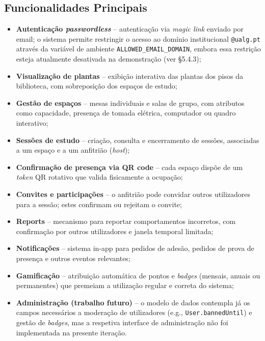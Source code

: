 \documentclass[11pt,a4paper]{article}
\begin{document}
\subsection{Funcionalidades Principais}
\begin{itemize}[leftmargin=*]
    \item \textbf{Autenticação \emph{passwordless}} -- autenticação via
          \emph{magic link} enviado por email; o sistema permite restringir o
          acesso ao domínio institucional \texttt{@ualg.pt} através da variável
          de ambiente \texttt{ALLOWED\_EMAIL\_DOMAIN}, embora essa restrição
          esteja atualmente desativada na demonstração (ver \S5.4.3);
    \item \textbf{Visualização de plantas} -- exibição interativa das plantas
          dos pisos da biblioteca, com sobreposição dos espaços de estudo;
    \item \textbf{Gestão de espaços} -- mesas individuais e salas de grupo,
          com atributos como capacidade, presença de tomada elétrica, computador ou
          quadro interativo;
    \item \textbf{Sessões de estudo} -- criação, consulta e encerramento de
          sessões, associadas a um espaço e a um anfitrião (\emph{host});
    \item \textbf{Confirmação de presença via QR code} -- cada espaço dispõe
          de um \emph{token} QR rotativo que valida fisicamente a ocupação;
    \item \textbf{Convites e participações} -- o anfitrião pode convidar outros
          utilizadores para a sessão; estes confirmam ou rejeitam o convite;
    \item \textbf{Reports} -- mecanismo para reportar comportamentos
          incorretos, com confirmação por outros utilizadores e janela temporal
          limitada;
    \item \textbf{Notificações} -- sistema in-app para pedidos de adesão,
          pedidos de prova de presença e outros eventos relevantes;
    \item \textbf{Gamificação} -- atribuição automática de pontos e
          \emph{badges} (mensais, anuais ou permanentes) que premeiam a utilização
          regular e correta do sistema;
    \item \textbf{Administração (trabalho futuro)} -- o modelo de dados
          contempla já os campos necessários a moderação de utilizadores
          (e.g., \texttt{User.bannedUntil}) e gestão de \emph{badges}, mas a
          respetiva interface de administração não foi implementada na presente
          iteração.
\end{itemize}
\end{document}
